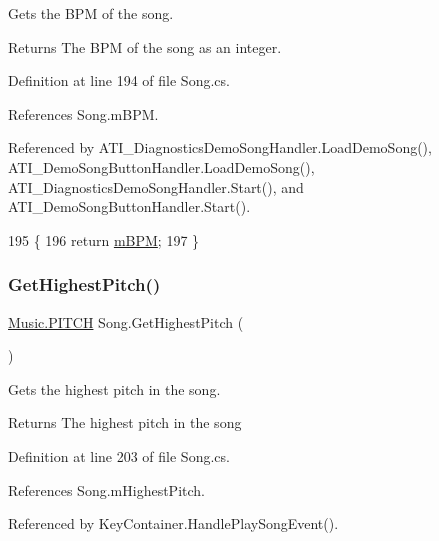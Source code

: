 Gets the B\+PM of the song. 

\begin{DoxyReturn}{Returns}
The B\+PM of the song as an integer. 
\end{DoxyReturn}


Definition at line 194 of file Song.\+cs.



References Song.\+m\+B\+PM.



Referenced by A\+T\+I\+\_\+\+Diagnostics\+Demo\+Song\+Handler.\+Load\+Demo\+Song(), A\+T\+I\+\_\+\+Demo\+Song\+Button\+Handler.\+Load\+Demo\+Song(), A\+T\+I\+\_\+\+Diagnostics\+Demo\+Song\+Handler.\+Start(), and A\+T\+I\+\_\+\+Demo\+Song\+Button\+Handler.\+Start().


\begin{DoxyCode}
195     \{
196         \textcolor{keywordflow}{return} \hyperlink{group___song_priv_var_ga3341fbbd9c0c58fe6514623e6b6c5a1e}{mBPM};
197     \}
\end{DoxyCode}
\mbox{\label{group___song_pub_func_gafaa104e8653edf64148260ecd400570f}} 
\subsubsection{\texorpdfstring{Get\+Highest\+Pitch()}{GetHighestPitch()}}
{\footnotesize\ttfamily \hyperlink{group___music_enums_ga508f69b199ea518f935486c990edac1d}{Music.\+P\+I\+T\+CH} Song.\+Get\+Highest\+Pitch (\begin{DoxyParamCaption}{ }\end{DoxyParamCaption})}



Gets the highest pitch in the song. 

\begin{DoxyReturn}{Returns}
The highest pitch in the song 
\end{DoxyReturn}


Definition at line 203 of file Song.\+cs.



References Song.\+m\+Highest\+Pitch.



Referenced by Key\+Container.\+Handle\+Play\+Song\+Event().


